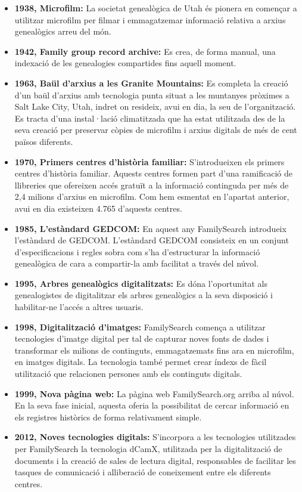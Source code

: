     \begin{itemize}
        \item \textbf{1938, Microfilm:} La societat genealògica de Utah és pionera en començar a utilitzar microfilm per filmar i emmagatzemar informació relativa a arxius genealògics arreu del món.
        \item \textbf{1942, Family group record archive:} Es crea, de forma manual, una indexació de les genealogies compartides fins aquell moment.
        \item \textbf{1963, Baül d’arxius a les Granite Mountains:} Es completa la creació d’un baül d’arxius amb tecnologia punta situat a les muntanyes pròximes a Salt Lake City, Utah, indret on resideix, avui en dia, la seu de l’organització. Es tracta d’una instal·lació climatitzada que ha estat utilitzada des de la seva creació per preservar còpies de microfilm i arxius digitals de més de cent països diferents.
        \item \textbf{1970, Primers centres d'història familiar:} S'introdueixen els primers centres d'història familiar. Aquests centres formen part d'una ramificació de llibreries que ofereixen accés gratuït a la informació continguda per més de 2,4 milions d'arxius en microfilm. Com hem esmentat en l'apartat anterior, avui en dia existeixen 4.765 d'aquests centres.
        \item \textbf{1985, L’estàndard GEDCOM:} En aquest any FamilySearch introdueix l'estàndard de \gls{GEDCOM}. L'estàndard GEDCOM consisteix en un conjunt d'especificacions i regles sobra com s'ha d'estructurar la informació genealògica de cara a compartir-la amb facilitat a través del núvol.
        \item \textbf{1995, Arbres genealògics digitalitzats:} Es dóna l’oportunitat als genealogistes de digitalitzar els arbres genealògics a la seva disposició i habilitar-ne l’accés a altres usuaris.
        \item \textbf{1998, Digitalització d’imatges:} FamilySearch comença a utilitzar tecnologies d'imatge digital per tal de capturar noves fonts de dades i transformar els milions de continguts, emmagatzemats fins ara en microfilm, en imatges digitals. La tecnologia també permet crear índexs de fàcil utilització que relacionen persones amb els continguts digitals.
        \item \textbf{1999, Nova pàgina web:} La pàgina web FamilySearch.org arriba al núvol. En la seva fase inicial, aquesta oferia la possibilitat de cercar informació en els registres històrics de forma relativament simple.
        \item \textbf{2012, Noves tecnologies digitals:} S’incorpora a les tecnologies utilitzades per FamilySearch la tecnologia dCamX, utilitzada per la digitalització de documents i la creació de  sales de lectura digital, responsables de facilitar les tasques de comunicació i alliberació de coneixement entre els diferents centres.
    \end{itemize}

